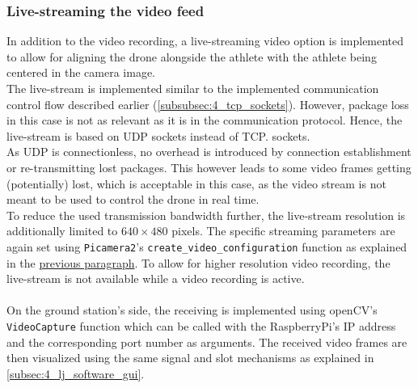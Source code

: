 \subsubsection{Live-streaming the video feed}\label{subsubsec:4_live_stream}
In addition to the video recording, a live-streaming video option is
implemented to allow for aligning the drone alongside the athlete with the
athlete being centered in the camera image.\\
The live-stream is implemented similar to the implemented communication
control flow described earlier (\autoref{subsubsec:4_tcp_sockets}).
However, package loss in this case is not as relevant as it is in the
communication protocol.
Hence, the live-stream is based on \ac{UDP} sockets instead of \ac{TCP}.
sockets.\\
As \ac{UDP} is connectionless, no overhead is introduced by connection
establishment or re-transmitting lost packages.
This however leads to some video frames getting (potentially) lost, which is
acceptable in this case, as the video stream is not meant to be used to
control the drone in real time.\\
To reduce the used transmission bandwidth further, the live-stream resolution
is additionally limited to $640 \times 480$ pixels.
The specific streaming parameters are again set using \texttt{Picamera2}'s
\texttt{create\_video\_configuration} function as explained in the
\hyperref[subsubsec:4_cam_setup_recording]{previous paragraph}.
To allow for higher resolution video recording, the live-stream is not
available while a video recording is active.\\\\
\noindent On the ground station's side, the receiving is implemented using
openCV's \texttt{VideoCapture} function which can be called with the
RaspberryPi's IP address and the corresponding port number as arguments.
The received video frames are then visualized using the same signal and slot
mechanisms as explained in \autoref{subsec:4_lj_software_gui}.

